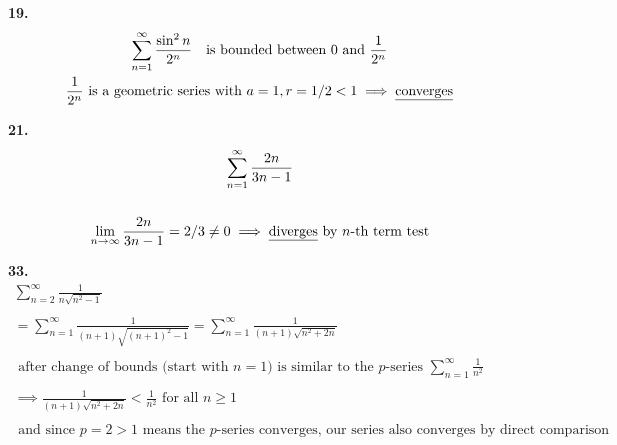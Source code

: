 \documentclass{article}
\begin{document}
\noindent
\textbf{
19.
}
\\
\begin{gather*}
\sum_{n=1}^{\infty} \frac{\sin^2 n}{2^n}
~~~\text{is bounded between 0 and } \frac{1}{2^n}
\\
\frac{1}{2^n} \text{ is a geometric series with } a=1, r=1/2<1
\implies \text{\underline{converges}}
\end{gather*}



\noindent
\textbf{
21.
}
\\
\begin{gather*}
\sum_{n=1}^{\infty} \frac{2n}{3n-1}
\\
\\
\lim_{n \to \infty} \frac{2n}{3n-1}=2/3 \neq 0
\implies \text{\underline{diverges} by $n$-th term test}
\end{gather*}



\noindent
\textbf{
33.
}
\\
\begin{gather*}
\sum_{n=2}^{\infty} \frac{1}{n\sqrt{n^2-1}}
\\
\\
=\sum_{n=1}^{\infty} \frac{1}{(n+1)\sqrt{(n+1)^2-1}}
=\sum_{n=1}^{\infty} \frac{1}{(n+1)\sqrt{n^2+2n}}
\\
\\
\text{ after change of bounds (start with $n=1$) is similar to the $p$-series }
\sum_{n=1}^{\infty} \frac{1}{n^2}
\\
\\
\implies
\frac{1}{(n+1)\sqrt{n^2+2n}}<\frac{1}{n^2}
\text{ for all } n \geq 1
\\
\\
\text{ and since $p=2>1$ means the $p$-series converges, our series also converges
by direct comparison}
\end{gather*}
\end{document}
